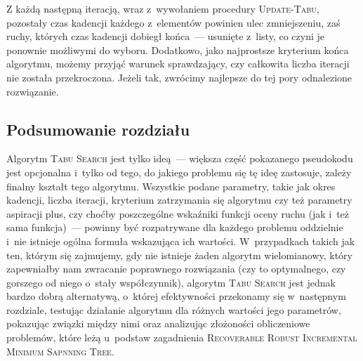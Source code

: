 Z każdą następną iteracją, wraz z~wywołaniem procedury \textsc{Update-Tabu}, pozostały czas kadencji każdego z~elementów powinien ulec zmniejszeniu, zaś ruchy, których czas kadencji dobiegł końca~--- usunięte z~listy, co czyni je ponownie możliwymi do wyboru.
Dodatkowo, jako najprostsze kryterium końca algorytmu, możemy przyjąć warunek sprawdzający, czy całkowita liczba iteracji nie została przekroczona.
Jeżeli tak, zwrócimy najlepsze do tej pory odnalezione rozwiązanie.



\subsection{Podsumowanie rozdziału}



Algorytm \textsc{Tabu Search} jest tylko ideą~--- większa część pokazanego pseudokodu jest opcjonalna i~tylko od tego, do jakiego problemu się tę ideę zastosuje, zależy finalny kształt tego algorytmu.
Wszystkie podane parametry, takie jak okres kadencji, liczba iteracji, kryterium zatrzymania się algorytmu czy też parametry aspiracji plus, czy choćby poszczególne wskaźniki funkcji oceny ruchu (jak i~też sama funkcja)~--- powinny być rozpatrywane dla każdego problemu oddzielnie i~nie istnieje ogólna formuła wskazująca ich wartości.
W~przypadkach takich jak ten, którym się zajmujemy, gdy nie istnieje żaden algorytm wielomianowy, który zapewniałby nam zwracanie poprawnego rozwiązania (czy to optymalnego, czy gorszego od niego o~stały współczynnik), algorytm \textsc{Tabu Search} jest jednak bardzo dobrą alternatywą, o~której efektywności przekonamy się w~następnym rozdziale, testując działanie algorytmu dla różnych wartości jego parametrów, pokazując związki między nimi oraz analizując złożoności obliczeniowe problemów, które leżą u~podstaw zagadnienia \textsc{Recoverable Robust Incremental Minimum Sapnning Tree}.
